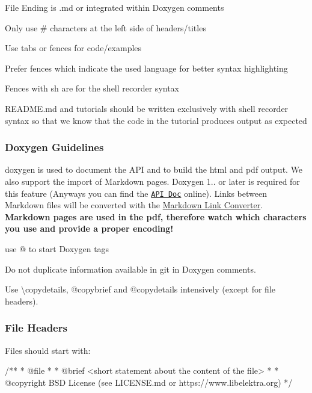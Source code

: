 \begin{DoxyItemize}
\item File Ending is {\ttfamily .md} or integrated within Doxygen comments
\item Only use {\ttfamily \#} characters at the left side of headers/titles
\item Use tabs or fences for code/examples
\item Prefer fences which indicate the used language for better syntax highlighting
\item Fences with sh are for the shell recorder syntax
\item {\ttfamily R\+E\+A\+D\+M\+E.\+md} and tutorials should be written exclusively with shell recorder syntax so that we know that the code in the tutorial produces output as expected
\end{DoxyItemize}

\subsubsection*{Doxygen Guidelines}

{\ttfamily doxygen} is used to document the A\+PI and to build the html and pdf output. We also support the import of Markdown pages. Doxygen 1.. or later is required for this feature (Anyways you can find the \href{https://doc.libelektra.org/api/latest/html/}{\tt A\+PI Doc} online). Links between Markdown files will be converted with the \hyperlink{doc_markdownlinkconverter_README_md}{Markdown Link Converter}. {\bfseries Markdown pages are used in the pdf, therefore watch which characters you use and provide a proper encoding!}


\begin{DoxyItemize}
\item use {\ttfamily @} to start Doxygen tags
\item Do not duplicate information available in git in Doxygen comments.
\item Use {\ttfamily \textbackslash{}copydetails}, {\ttfamily @copybrief} and {\ttfamily @copydetails} intensively (except for file headers).
\end{DoxyItemize}

\subsubsection*{File Headers}

Files should start with\+:

\begin{DoxyVerb}        /**
         * @file
         *
         * @brief <short statement about the content of the file>
         *
         * @copyright BSD License (see LICENSE.md or https://www.libelektra.org)
         */\end{DoxyVerb}



